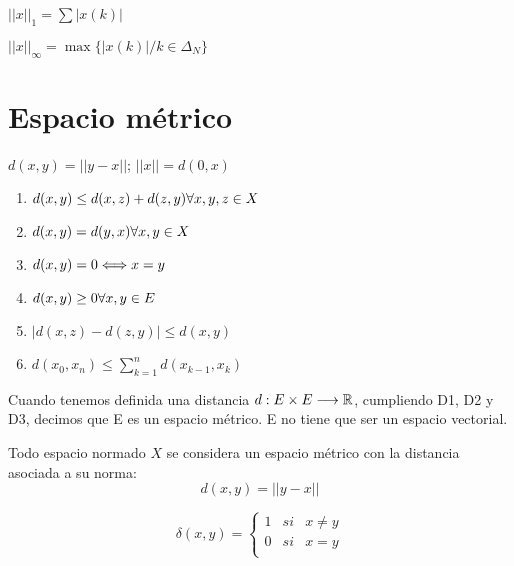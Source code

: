     \begin{ejemplo}
        $||x||_1 = \sum |x(k)|$
    \end{ejemplo}

    \begin{ejemplo}
        $||x||_\infty = \max\{|x(k)| / k \in \Delta_N\}$ 
    \end{ejemplo}
        
    

\section{Espacio métrico}
    \begin{definicion}[Distancia]
        $d(x,y) = ||y - x||$; 
        $||x|| = d(0,x )$
    \end{definicion}
        \begin{enumerate}
            \item $d(x,y) \leq d(x,z) + d(z,y) \\ \forall x,y,z \in X$
            \item $d(x,y) = d(y,x)\\ \forall x,y \in X$
            \item $d(x,y) =0 \Longleftrightarrow x=y$
            \item $d(x,y) \geq 0\\ \forall x,y \in E$
            \item $|d(x,z) - d(z,y)| \leq d(x,y)$
            \item $d(x_0,x_n) \leq \sum\limits_{k=1}^n d(x_{k-1},x_k)$
        \end{enumerate}

    
        Cuando tenemos definida una distancia $d:E\times E \longrightarrow \mathbb R$, cumpliendo D1, D2 y D3, decimos que E es un espacio métrico. E no tiene que ser un espacio vectorial.
        
        Todo espacio normado $X$ se considera un espacio métrico con la distancia asociada a su norma: 
        $$d(x,y) = ||y-x||$$

    \begin{ejemplo}
        $$\delta (x,y) = \left\{ \begin{array}{lll}
            1 & si & x\neq y\\
            0 & si & x= y\\
        \end{array} \right.$$
    \end{ejemplo}
    

